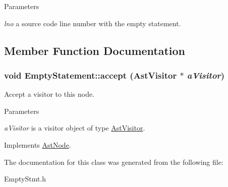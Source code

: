 \begin{DoxyParams}{Parameters}
\item[{\em lno}]a source code line number with the empty statement. \end{DoxyParams}


\subsection{Member Function Documentation}
\hypertarget{classEmptyStatement_a54138a042d8de2fecf90448a0048757b}{
\subsubsection[{accept}]{\setlength{\rightskip}{0pt plus 5cm}void EmptyStatement::accept ({\bf AstVisitor} $\ast$ {\em aVisitor})}}
\label{classEmptyStatement_a54138a042d8de2fecf90448a0048757b}
Accept a visitor to this node. 
\begin{DoxyParams}{Parameters}
\item[{\em aVisitor}]is a visitor object of type \hyperlink{classAstVisitor}{AstVisitor}. \end{DoxyParams}


Implements \hyperlink{classAstNode_a67b2d6ce1262da2954fb4db255759fb3}{AstNode}.

The documentation for this class was generated from the following file:\begin{DoxyCompactItemize}
\item 
EmptyStmt.h\end{DoxyCompactItemize}

